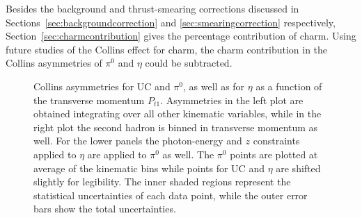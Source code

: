 Besides the background and thrust-smearing corrections discussed in Sections~\ref{sec:backgroundcorrection} and \ref{sec:smearingcorrection} respectively, Section~\ref{sec:charmcontribution} gives the percentage contribution of charm. Using future studies of the Collins effect for charm, the charm contribution in the Collins asymmetries of $\pi^0$ and $\eta$ could be subtracted. 


\begin{figure}[H]
  \centering
\caption[Collins asymmetries for UC and $\pi^0$, as well as for $\eta$ as a function of $P_{t1}$]{Collins asymmetries for UC and $\pi^0$, as well as for $\eta$ as a function of the transverse momentum $P_{t1}$. 
Asymmetries in the left plot are obtained integrating over all other kinematic variables, while in the right plot the second hadron is binned in transverse momentum as well.
For the lower panels the photon-energy and $z$ constraints applied to $\eta$ are applied to $\pi^0$ as well. 
The $\pi^0$ points are plotted at average of the kinematic bins while points for UC and $\eta$ are shifted slightly for legibility. 
The inner shaded regions represent the statistical uncertainties of each data point, while the outer error bars show the total uncertainties.}
\label{fig:finalasymmetry1}
\end{figure}

